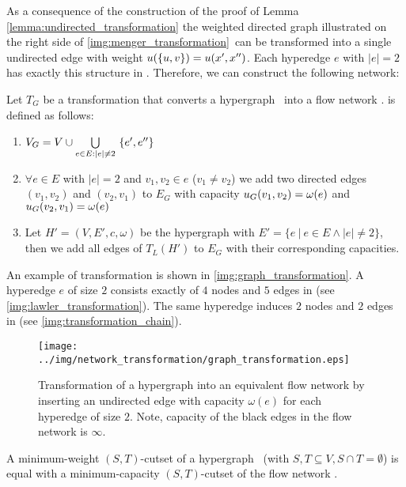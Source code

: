 As a consequence of the construction of the proof of Lemma \ref{lemma:undirected_transformation}
the weighted directed graph illustrated on the right side of
\autoref{img:menger_transformation}~can be transformed into a single undirected edge with weight
$u(\{u,v\}) = u(x',x'')$.
Each hyperedge $e$ with $|e| = 2$ has exactly this structure in . Therefore, we can 
construct the following network:

\begin{definition}
Let $T_G$ be a transformation that converts a hypergraph \HypergraphDef~into 
a flow network .  is defined as follows:
\begin{enumerate}
\item $V_G = V \cup \bigcup\limits_{\substack{e \in E: |e| \neq 2}}\ \{e', e''\}$
\item $\forall e \in E$ with $|e| = 2$ and $v_1,v_2 \in e$ ($v_1 \neq v_2$) we add 
      two directed edges $(v_1,v_2)$ and $(v_2,v_1)$ to $E_G$ with capacity $u_G(v_1,v_2) = \omega(e)$
      and $u_G(v_2,v_1) = \omega(e)$
\item Let $H' = (V,E',c,\omega)$ be the hypergraph with $E' = \{e\ |\ e \in E \land |e| \neq 2\}$,
      then we add all edges of $T_L(H')$ to $E_G$ with their corresponding capacities.
\end{enumerate} 
\end{definition}

An example of transformation  is shown in \autoref{img:graph_transformation}. A hyperedge
$e$ of size $2$ consists exactly of $4$ nodes and $5$ edges in  (see \autoref{img:lawler_transformation}).
The same hyperedge induces $2$ nodes and $2$ edges in  (see \autoref{img:transformation_chain}). 
 
\begin{figure}
\centering
\texttt{[image: ../img/network\_transformation/graph\_transformation.eps]}
\caption{Transformation of a hypergraph into an equivalent flow network by inserting 
         an undirected edge with capacity $\omega(e)$ for each hyperedge of size $2$. 
         Note, capacity of the black edges in the flow network is $\infty$.}
\label{img:graph_transformation}
\end{figure}

\begin{theorem}
A minimum-weight $(S,T)$-cutset of a hypergraph \HypergraphDef~(with $S,T \subseteq V,
S \cap T = \emptyset$) is equal with a minimum-capacity $(S,T)$-cutset of the
flow network .
\label{theorem:graph_transformation}
\end{theorem}

